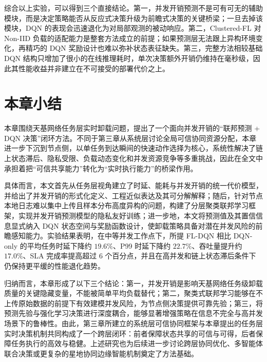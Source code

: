 \begin{table}[H]
\centering
\footnotesize
\caption{消融实验的详细结果}
\label{tab:ablation_detail}
\setlength{\tabcolsep}{2.0mm}
\renewcommand{\arraystretch}{1.15}
\end{table}

综合以上实验，可以得到三个直接结论。第一，并发开销预测不是可有可无的辅助模块，而是决定策略能否从反应式决策升级为前瞻式决策的关键桥梁；一旦去掉该模块，DQN 的表现会迅速退化为对局部观测的被动响应。第二，Clustered-FL 对 Non-IID 负载的适配能力是整套方法成立的前提；如果预测层无法跟上异构环境变化，再精巧的 DQN 奖励设计也难以弥补状态表征缺失。第三，完整方法相较基础 DQN 结构只增加了很小的在线推理耗时，单次决策额外开销仍维持在毫秒级，因此其性能收益并非建立在不可接受的部署代价之上。
\section{本章小结}
\label{sec:chapter4_conclusion}

本章围绕天基网络任务层实时卸载问题，提出了一个面向并发开销的“联邦预测 + DQN 决策”闭环方法。不同于第三章从系统层讨论全局可信协同资源分配，本章进一步下沉到节点侧，以单任务到达瞬间的快速动作选择为核心，系统性解决了链上状态滞后、隐私受限、负载动态变化和并发资源竞争等多重挑战，因此在全文中承担着把“可信共享能力”转化为“实时执行能力”的桥梁作用。

具体而言，本文首先从任务层视角建立了时延、能耗与并发开销的统一代价模型，并给出了并发开销的形式化定义、工程近似表达及其可分解解释；随后，针对节点本地日志难以集中上传且样本分布高度异构的问题，构建了分层聚类联邦学习框架，实现并发开销预测模型的隐私友好训练；进一步地，本文将预测值及其置信信息显式纳入 DQN 状态空间与奖励函数设计，使卸载策略具备对潜在并发风险的前瞻感知能力。实验结果表明，在中等并发工作点下，所提 FL-DQN 相比 DQN-only 的平均任务时延下降约 $19.6\%$、P99 时延下降约 $22.7\%$、吞吐量提升约 $17.0\%$、SLA 完成率提高超过 $6$ 个百分点，并且在高并发和链上状态滞后条件下仍保持更平缓的性能退化趋势。

归纳而言，本章形成了以下三个结论：第一，并发开销是影响天基网络任务级卸载质量的关键隐藏变量，不能被简单平均负载替代；第二，聚类式联邦学习能够在不上传原始数据的前提下有效建模并发风险，为节点侧决策提供可靠先验；第三，将预测先验与强化学习决策进行深度耦合，能够显著增强策略在信息不完全与高并发场景下的鲁棒性。由此，第三章所建立的系统层可信协同框架与本章提出的任务层实时决策机制共同构成了一个跨层闭环：前者保障状态共享的可信与可得，后者保障任务执行的高效与稳健。上述研究也为后续进一步讨论跨层协同优化、多智能体联合决策或更复杂的星地协同边缘智能机制奠定了方法基础。
